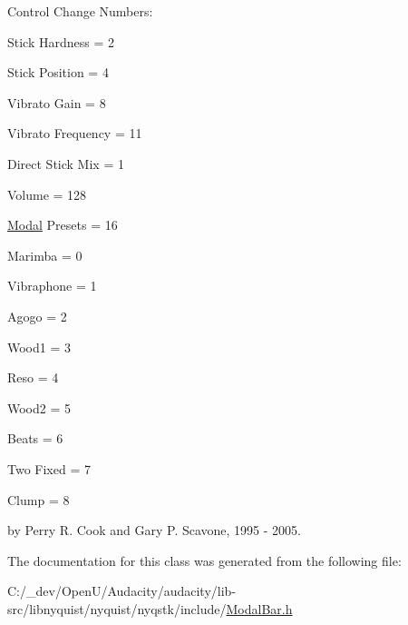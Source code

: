 Control Change Numbers\+:
\begin{DoxyItemize}
\item Stick Hardness = 2
\item Stick Position = 4
\item Vibrato Gain = 8
\item Vibrato Frequency = 11
\item Direct Stick Mix = 1
\item Volume = 128
\item \hyperlink{class_modal}{Modal} Presets = 16
\begin{DoxyItemize}
\item Marimba = 0
\item Vibraphone = 1
\item Agogo = 2
\item Wood1 = 3
\item Reso = 4
\item Wood2 = 5
\item Beats = 6
\item Two Fixed = 7
\item Clump = 8
\end{DoxyItemize}
\end{DoxyItemize}

by Perry R. Cook and Gary P. Scavone, 1995 -\/ 2005. 

The documentation for this class was generated from the following file\+:\begin{DoxyCompactItemize}
\item 
C\+:/\+\_\+dev/\+Open\+U/\+Audacity/audacity/lib-\/src/libnyquist/nyquist/nyqstk/include/\hyperlink{_modal_bar_8h}{Modal\+Bar.\+h}\end{DoxyCompactItemize}

